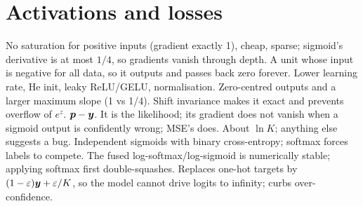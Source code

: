 \section{Activations and losses}
\begin{rapid}
	 No saturation for positive inputs (gradient exactly 1), cheap, sparse;
	sigmoid's derivative is at most $1/4$, so gradients vanish through depth.
	 A unit whose input is negative for all data, so it outputs and passes
	back zero forever. Lower learning rate, He init, leaky ReLU/GELU, normalisation.
	 Zero-centred outputs and a larger maximum slope (1 vs 1/4).
	 Shift invariance makes it exact and prevents overflow of $e^{z}$.
	 $\bm p-{\bm{y}}$.
	 It is the likelihood; its gradient does not vanish when a
	sigmoid output is confidently wrong; MSE's does.
	 About $\ln K$; anything else suggests a bug.
	 Independent sigmoids with binary cross-entropy; softmax forces labels to compete.
	 The fused log-softmax/log-sigmoid is numerically stable; applying
	softmax first double-squashes.
	 Replaces one-hot targets by $(1-\varepsilon){\bm{y}}+\varepsilon/K$, so the model cannot drive logits to
	infinity; curbs over-confidence.
\end{rapid}

